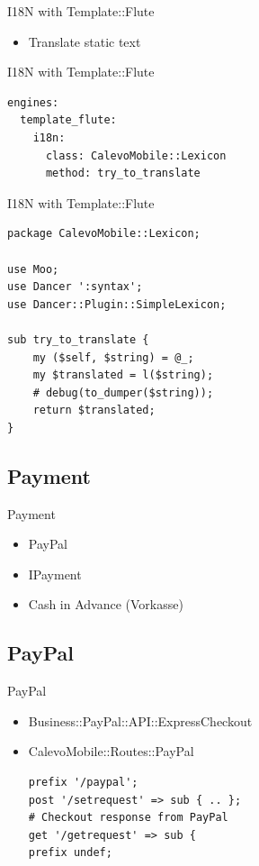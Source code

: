 \begin{frame}[fragile]{I18N with Template::Flute}
\begin{itemize}
\item Translate static text
\end{itemize}
\end{frame}

\begin{frame}[fragile]{I18N with Template::Flute}
\begin{lstlisting}
engines:
  template_flute:
    i18n:
      class: CalevoMobile::Lexicon
      method: try_to_translate
\end{lstlisting}
\end{frame}

\begin{frame}[fragile]{I18N with Template::Flute}
\begin{lstlisting}
package CalevoMobile::Lexicon;

use Moo;
use Dancer ':syntax';
use Dancer::Plugin::SimpleLexicon;

sub try_to_translate {
    my ($self, $string) = @_;
    my $translated = l($string);
    # debug(to_dumper($string));
    return $translated;
}
\end{lstlisting}
\end{frame}

\subsection{Payment}
\begin{frame}{Payment}
\begin{itemize}
\item PayPal
\item IPayment
\item Cash in Advance (Vorkasse)
\end{itemize}
\end{frame}

\subsection{PayPal}
\begin{frame}[fragile]{PayPal}
\begin{itemize}
\item Business::PayPal::API::ExpressCheckout
\item CalevoMobile::Routes::PayPal
\begin{lstlisting}
prefix '/paypal';
post '/setrequest' => sub { .. };
# Checkout response from PayPal
get '/getrequest' => sub {
prefix undef;
\end{lstlisting}
\end{itemize}
\end{frame}

